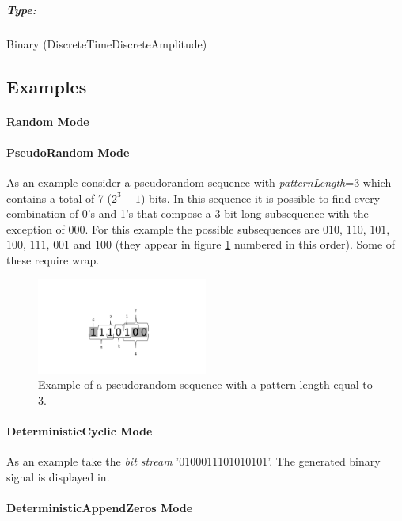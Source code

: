 \subparagraph*{Type:} Binary (DiscreteTimeDiscreteAmplitude)

\subsection*{Examples}

\paragraph*{Random Mode}

\paragraph*{PseudoRandom Mode}
As an example consider a pseudorandom sequence with \textit{patternLength}=3 which contains a total of 7 ($2^3-1$) bits. In this sequence it is possible to find every combination of 0's and 1's that compose a 3 bit long subsequence with the exception of $000$. For this example the possible subsequences are $010$, $110$, $101$, $100$, $111$, $001$ and $100$ (they appear in figure \ref{BinarySequenceN3} numbered in this order). Some of these require wrap.

\begin{figure}[h]
	\centering
\includegraphics[width=0.5\textwidth]{./lib/binary_source/figures/BinarySequenceN3}
\caption{Example of a pseudorandom sequence with a pattern length equal to 3.}\label{BinarySequenceN3}
\end{figure}

\paragraph*{DeterministicCyclic Mode}

As an example take the \textit{bit stream} '0100011101010101'. The generated binary signal is displayed in.

\paragraph*{DeterministicAppendZeros Mode}

